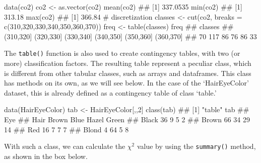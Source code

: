 \documentclass[a4paper,12pt,oneside]{book}
\newenvironment{Shaded}{\begin{snugshade}}{\end{snugshade}}
\newcommand{\DecValTok}[1]{#1}
\newcommand{\CommentTok}[1]{#1}
\newcommand{\DocumentationTok}[1]{#1}
\newcommand{\OtherTok}[1]{#1}
\newcommand{\FunctionTok}[1]{#1}
\newcommand{\AttributeTok}[1]{#1}
\newcommand{\NormalTok}[1]{#1}
\begin{document}
\begin{Shaded}
\begin{Highlighting}[]
\FunctionTok{data}\NormalTok{(co2)}
\NormalTok{co2 }\OtherTok{\textless{}{-}} \FunctionTok{as.vector}\NormalTok{(co2)}
\FunctionTok{mean}\NormalTok{(co2)}
\DocumentationTok{\#\# [1] 337.0535}
\FunctionTok{min}\NormalTok{(co2)}
\DocumentationTok{\#\# [1] 313.18}
\FunctionTok{max}\NormalTok{(co2)}
\DocumentationTok{\#\# [1] 366.84}
\CommentTok{\# discretization}
\NormalTok{classes }\OtherTok{\textless{}{-}} \FunctionTok{cut}\NormalTok{(co2, }\AttributeTok{breaks =} \FunctionTok{c}\NormalTok{(}\DecValTok{310}\NormalTok{,}\DecValTok{320}\NormalTok{,}\DecValTok{330}\NormalTok{,}\DecValTok{340}\NormalTok{,}\DecValTok{350}\NormalTok{,}\DecValTok{360}\NormalTok{,}\DecValTok{370}\NormalTok{))}
\NormalTok{freq }\OtherTok{\textless{}{-}} \FunctionTok{table}\NormalTok{(classes)}
\NormalTok{freq}
\DocumentationTok{\#\# classes}
\DocumentationTok{\#\# (310,320] (320,330] (330,340] (340,350] (350,360] (360,370] }
\DocumentationTok{\#\#        70       117        86        76        86        33}
\end{Highlighting}
\end{Shaded}

The \texttt{table()} function is also used to create contingency tables, with two (or more) classification factors. The resulting table represent a peculiar class, which is different from other tabular classes, such as arrays and dataframes. This class has methods on its own, as we will see below. In the case of the `HairEyeColor' dataset, this is already defined as a contingency table of class `table.'

\begin{Shaded}
\begin{Highlighting}[]
\FunctionTok{data}\NormalTok{(HairEyeColor)}
\NormalTok{tab }\OtherTok{\textless{}{-}}\NormalTok{ HairEyeColor[,,}\DecValTok{2}\NormalTok{]}
\FunctionTok{class}\NormalTok{(tab)}
\DocumentationTok{\#\# [1] "table"}
\NormalTok{tab}
\DocumentationTok{\#\#        Eye}
\DocumentationTok{\#\# Hair    Brown Blue Hazel Green}
\DocumentationTok{\#\#   Black    36    9     5     2}
\DocumentationTok{\#\#   Brown    66   34    29    14}
\DocumentationTok{\#\#   Red      16    7     7     7}
\DocumentationTok{\#\#   Blond     4   64     5     8}
\end{Highlighting}
\end{Shaded}

With such a class, we can calculate the \(\chi^2\) value by using the \texttt{summary()} method, as shown in the box below.
\end{document}
